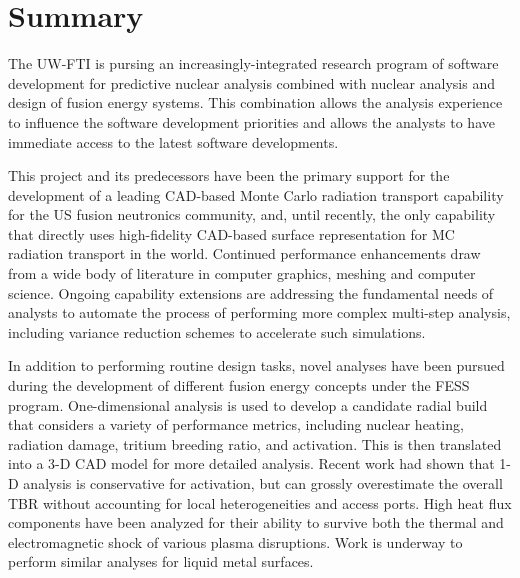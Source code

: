 \section{Summary}

The \gls{UW-FTI} is pursing an increasingly-integrated research program of
software development for predictive nuclear analysis combined with nuclear
analysis and design of fusion energy systems.  This combination allows the
analysis experience to influence the software development priorities and
allows the analysts to have immediate access to the latest software
developments.

This project and its predecessors have been the primary support for the
development of a leading CAD-based Monte Carlo radiation transport capability
for the US fusion neutronics community, and, until
recently, the only capability that directly uses
high-fidelity CAD-based surface representation for MC radiation transport in
the world.  Continued performance enhancements draw from a wide body of
literature in computer graphics, meshing and computer science.  Ongoing
capability extensions are addressing the fundamental needs of analysts to
automate the process of performing more complex multi-step analysis, including
variance reduction schemes to accelerate such simulations.

In addition to performing routine design tasks, novel analyses have been
pursued during the development of different fusion energy concepts under the
\gls{FESS} program.  One-dimensional analysis is used to develop a candidate
radial build that considers a variety of performance metrics, including
nuclear heating, radiation damage, tritium breeding ratio, and activation.
This is then translated into a 3-D CAD model for more detailed analysis.
Recent work had shown that 1-D analysis is conservative for activation, but
can grossly overestimate the overall \gls{TBR} without accounting for local
heterogeneities and access ports.  High heat flux components have been
analyzed for their ability to survive both the thermal and electromagnetic
shock of various plasma disruptions.  Work is underway to perform similar
analyses for liquid metal surfaces.
